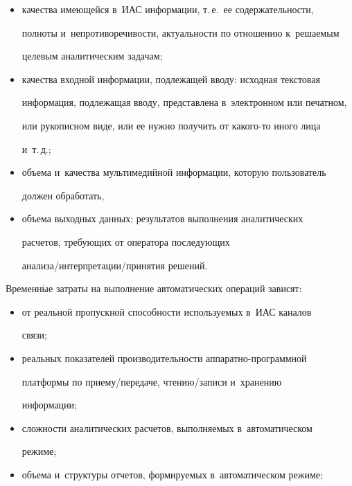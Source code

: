 \begin{enumerate}[1.]
\begin{itemize}
и~пр.;


\item качества имеющейся в~ИАС информации, т.\,е.\ ее содержательности, 


полноты и~непротиворечивости, актуальности по отношению к~решаемым 


целевым аналитическим задачам;


\item качества входной информации, подлежащей вводу: исходная текстовая 


информация, подлежащая вводу, представлена в~электронном или печатном, 


или рукописном виде, или ее нужно получить от ка\-ко\-го-то иного лица 


и~т.\,д.;


\item объема и~качества мультимедийной информации, которую пользователь 


должен обработать,


\item объема выходных данных: результатов выполнения аналитических 


расчетов, требующих от оператора последующих  


ана\-ли\-за/ин\-тер\-пре\-та\-ции/при\-ня\-тия решений.


\end{itemize}


      


      Временн$\acute{\mbox{ы}}$е затраты на выполнение автоматических операций зависят:


      \begin{itemize}


\item от реальной пропускной способности используемых в~ИАС каналов 


связи;


\item реальных показателей производительности аппаратно-программной 


платформы по при\-ему/пе\-ре\-да\-че, чте\-нию/за\-пи\-си и~хранению 


информации;


\item сложности аналитических расчетов, выполняемых в~автоматическом 


режиме;


\item объема и~структуры отчетов, формируемых в~автоматическом режиме;



\end{itemize}
\end{enumerate}

